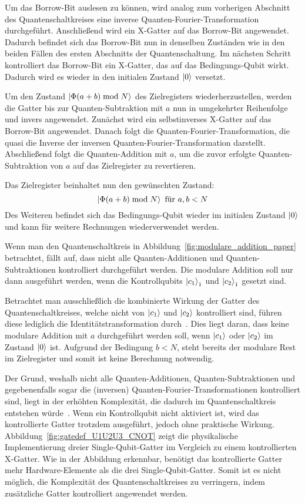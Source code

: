 Um das Borrow-Bit auslesen zu können, 
wird analog zum vorherigen Abschnitt des Quantenschaltkreises eine inverse Quanten-Fourier-Transformation durchgeführt.
Anschließend wird ein X-Gatter auf das Borrow-Bit angewendet.
Dadurch befindet sich das Borrow-Bit nun in denselben Zuständen wie in den beiden Fällen des ersten Abschnitts der Quantenschaltung.
Im nächsten Schritt kontrolliert das Borrow-Bit ein X-Gatter, das auf das Bedingungs-Qubit wirkt.
Dadurch wird es wieder in den initialen Zustand \(\ket{0}\) versetzt.

Um den Zustand \(\ket{\Phi(a+b)\bmod N}\) des Zielregisters wiederherzustellen, 
werden die Gatter bis zur Quanten-Subtraktion mit \(a\)
nun in umgekehrter Reihenfolge und invers angewendet.
Zunächst wird ein selbstinverses X-Gatter auf das Borrow-Bit angewendet.
Danach folgt die Quanten-Fourier-Transformation, 
die quasi die Inverse der inversen Quanten-Fourier-Transformation darstellt.
Abschließend folgt die Quanten-Addition mit \(a\), 
um die zuvor erfolgte Quanten-Subtraktion von \(a\) auf das Zielregister zu revertieren.

Das Zielregister beinhaltet nun den gewünschten Zustand:
\[\ket{\Phi(a+b)\bmod N} \text{ für } a, b < N\]
Des Weiteren befindet sich das Bedingungs-Qubit wieder im initialen Zustand \(\ket{0}\) und kann für weitere Rechnungen wiederverwendet werden.

\bigskip

Wenn man den Quantenschaltkreis in Abbildung~\ref{fig:modulare_addition_paper} betrachtet,
fällt auf, 
dass nicht alle Quanten-Additionen und Quanten-Subtraktionen kontrolliert durchgeführt werden.
Die modulare Addition soll nur dann ausgeführt werden, 
wenn die Kontrollqubits \(\ket{c_1}_1\) und \(\ket{c_2}_1\) gesetzt sind.

Betrachtet man ausschließlich die kombinierte Wirkung der Gatter des Quantenschaltkreises, 
welche nicht von \(\ket{c_1}\) und \(\ket{c_2}\) kontrolliert sind, 
führen diese lediglich die Identitätstransformation durch~\cite{beauregard2003circuit}.
Dies liegt daran, dass keine modulare Addition mit \(a\) durchgeführt werden soll, 
wenn \(\ket{c_1}\) oder \(\ket{c_2}\) im Zustand \(\ket{0}\) ist. 
Aufgrund der Bedingung \(b < N\), 
steht bereits der modulare Rest im Zielregister und somit ist keine Berechnung notwendig.

Der Grund, weshalb nicht alle Quanten-Additionen, 
Quanten-Subtraktionen und gegebenenfalls sogar die (inversen) Quanten-Fourier-Transformationen kontrolliert sind,
liegt in der erhöhten Komplexität, die dadurch im Quantenschaltkreis entstehen würde~\cite{beauregard2003circuit}.
Wenn ein Kontrollqubit nicht aktiviert ist, wird das kontrollierte Gatter trotzdem ausgeführt, jedoch ohne praktische Wirkung.
Abbildung~\ref{fig:gatedef_U1U2U3_CNOT} zeigt die physikalische Implementierung dreier Single-Qubit-Gatter im Vergleich zu einem kontrollierten X-Gatter.
Wie in der Abbildung erkennbar, 
benötigt das kontrollierte Gatter mehr Hardware-Elemente als die drei Single-Qubit-Gatter.
Somit ist es nicht möglich, 
die Komplexität des Quantenschaltkreises zu verringern, 
indem zusätzliche Gatter kontrolliert angewendet werden.

